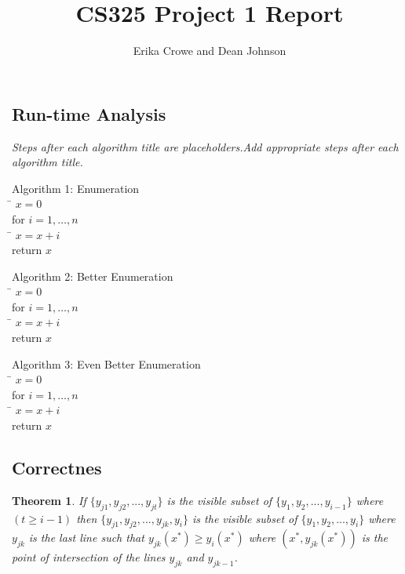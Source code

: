 \documentclass{article}
\title{CS325 Project 1 Report}
\author{Erika Crowe and Dean Johnson}
\newtheorem{theorem}{Theorem}
\begin{document}
\maketitle


\subsection*{Run-time Analysis}


\emph{Steps after each algorithm title are placeholders.\newline Add appropriate steps after each algorithm title.}

\begin{tabbing}
  {\sc Algorithm 1: Enumeration}\\
  \qquad \= $x = 0$ \\
  \> for $i = 1, \ldots, n$\\
  \> \qquad \= $x = x+i$\\
  \> return $x$
\end{tabbing}

\begin{tabbing}
  {\sc Algorithm 2: Better Enumeration}\\
  \qquad \= $x = 0$ \\
  \> for $i = 1, \ldots, n$\\
  \> \qquad \= $x = x+i$\\
  \> return $x$
\end{tabbing}

\begin{tabbing}
  {\sc Algorithm 3: Even Better Enumeration}\\
  \qquad \= $x = 0$ \\
  \> for $i = 1, \ldots, n$\\
  \> \qquad \= $x = x+i$\\
  \> return $x$
\end{tabbing}

\subsection*{Correctnes}

\begin{theorem}
  If \emph{$\{y_{j1},y_{j2},...,y_{jt}\}$} is the visible subset of \emph{$\{y_{1},y_{2},...,y_{i-1}\}$} where \emph{$(t \geq i-1)$} then $\{y_{j1},y_{j2},...,y_{jk},y_{i}\}$ is the visible subset of $\{y_{1},y_{2},...,y_{i}\}$ where $y_{jk}$ is the last line such that $y_{jk}(x^{*}) \geq y_{i}(x^{*})$ where $(x^{*},y_{jk}(x^{*}))$ is the point of intersection of the lines $y_{jk}$ and $y_{jk-1}$.
\end{theorem}
\end{document}
